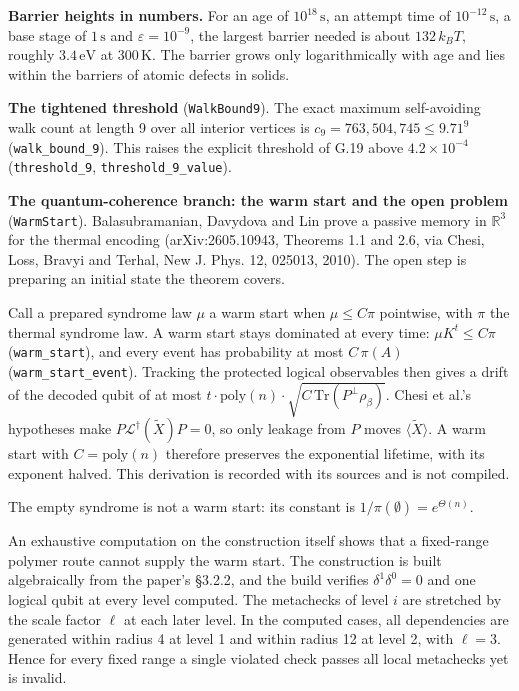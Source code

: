 \documentclass[
]{article}
\begin{document}
\textbf{Barrier heights in numbers.} For an age of
\(10^{18}\,\mathrm s\), an attempt time of \(10^{-12}\,\mathrm s\), a
base stage of \(1\,\mathrm s\) and \(\varepsilon=10^{-9}\), the largest
barrier needed is about \(132\,k_BT\), roughly \(3.4\,\mathrm{eV}\) at
\(300\,\mathrm K\). The barrier grows only logarithmically with age and
lies within the barriers of atomic defects in solids.

\textbf{The tightened threshold} (\texttt{WalkBound9}). The exact
maximum self-avoiding walk count at length 9 over all interior vertices
is \(c_9=763{,}504{,}745\le9.71^9\) (\texttt{walk\_bound\_9}). This
raises the explicit threshold of G.19 above \(4.2\times10^{-4}\)
(\texttt{threshold\_9},
\texttt{t\allowbreak{}h\allowbreak{}r\allowbreak{}e\allowbreak{}s\allowbreak{}h\allowbreak{}o\allowbreak{}l\allowbreak{}d\allowbreak{}\_\allowbreak{}9\allowbreak{}\_\allowbreak{}v\allowbreak{}a\allowbreak{}l\allowbreak{}u\allowbreak{}e}).

\textbf{The quantum-coherence branch: the warm start and the open
problem} (\texttt{WarmStart}). Balasubramanian, Davydova and Lin prove a
passive memory in \(\mathbb R^3\) for the thermal encoding
(arXiv:2605.10943, Theorems 1.1 and 2.6, via Chesi, Loss, Bravyi and
Terhal, New J. Phys. 12, 025013, 2010). The open step is preparing an
initial state the theorem covers.

Call a prepared syndrome law \(\mu\) a warm start when \(\mu\le C\pi\)
pointwise, with \(\pi\) the thermal syndrome law. A warm start stays
dominated at every time: \(\mu K^t\le C\pi\) (\texttt{warm\_start}), and
every event has probability at most \(C\,\pi(A)\)
(\texttt{warm\_start\_event}). Tracking the protected logical
observables then gives a drift of the decoded qubit of at most
\(t\cdot\mathrm{poly}(n)\cdot\sqrt{C\,\mathrm{Tr}(P^\perp\rho_\beta)}\).
Chesi et al.'s hypotheses make \(P\mathcal L^\dagger(\tilde X)P=0\), so
only leakage from \(P\) moves \(\langle\tilde X\rangle\). A warm start
with \(C=\mathrm{poly}(n)\) therefore preserves the exponential
lifetime, with its exponent halved. This derivation is recorded with its
sources and is not compiled.

The empty syndrome is not a warm start: its constant is
\(1/\pi(\emptyset)=e^{\Theta(n)}\).

An exhaustive computation on the construction itself shows that a
fixed-range polymer route cannot supply the warm start. The construction
is built algebraically from the paper's §3.2.2, and the build verifies
\(\delta^1\delta^0=0\) and one logical qubit at every level computed.
The metachecks of level \(i\) are stretched by the scale factor \(\ell\)
at each later level. In the computed cases, all dependencies are
generated within radius 4 at level 1 and within radius 12 at level 2,
with \(\ell=3\). Hence for every fixed range a single violated check
passes all local metachecks yet is invalid.
\end{document}
